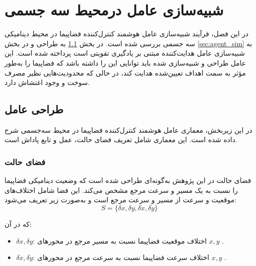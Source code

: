 \chapter{شبیه‌سازی عامل درمحیط سه جسمی}

%
	

	
		در این فصل، فرآیند شبیه‌سازی عامل هوشمند کنترل‌کننده فضاپیما در محیط دینامیکی سه جسمی بررسی شده است.
		در بخش \ref{sec:agent_design}
		به
		طراحی و 
		در بخش 
		\ref{sec:agent_sim}
	به	شبیه‌سازی عامل هدایت‌کننده مبتنی بر یادگیری تقویتی است
		پرداخته شده است. این عامل طراحی و شبیه‌سازی شده باید توانایی این را داشته باشد 
		 که  فضاپیما را به‌طور مؤثر به سمت اهداف تعیین‌شده هدایت کند، در حالی که محدودیت‌هایی نظیر مصرف سوخت و وجود اغتشاش دارد.
	
	
	\section{طراحی عامل}\label{sec:agent_design}
	
	در این زیربخش، معماری عامل هوشمند کنترل‌کننده فضاپیما در محیط سه‌جسمی شرح داده شده است. این معماری شامل تعریف فضای حالت، عمل و تابع پاداش است.

	
	\subsection{ فضای حالت}

فضای حالت
در این پژوهش به‌گونه‌ای طراحی شده است که وضعیت دینامیکی فضاپیما را نسبت به یک مسیر و سرعت مرجع مشخص می‌کند. این فضا شامل اختلاف‌های موقعیت و سرعت از مسیر و سرعت مرجع  است و به‌صورت زیر تعریف می‌شود:
\[
S = \{ \delta x, \delta y, \delta \dot{x}, \delta \dot{y} \}
\]

که در آن:
\begin{itemize}
    \item \( \delta x, \delta y \): اختلاف موقعیت فضاپیما نسبت به مسیر مرجع در محورهای \( x, y \) .
    \item \( \delta \dot{x}, \delta \dot{y} \): اختلاف سرعت فضاپیما نسبت به سرعت مرجع در محورهای \( x, y \) .
\end{itemize}

